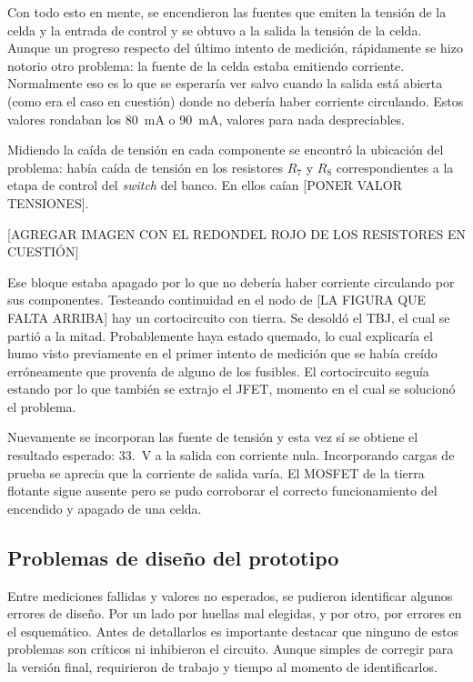 Con todo esto en mente, se encendieron las fuentes que emiten la tensión de la celda y la entrada de control y se obtuvo a la salida la tensión de la celda. Aunque un progreso respecto del último intento de medición, rápidamente se hizo notorio otro problema: la fuente de la celda estaba emitiendo corriente. Normalmente eso es lo que se esperaría ver salvo cuando la salida está abierta (como era el caso en cuestión) donde no debería haber corriente circulando. Estos valores rondaban los \SI{80}{\milli\ampere} o \SI{90}{\milli\ampere}, valores para nada despreciables. 

Midiendo la caída de tensión en cada componente se encontró la ubicación del problema: había caída de tensión en los resistores $R_7$ y $R_8$ correspondientes a la etapa de control del \textit{switch} del banco. En ellos caían [PONER VALOR TENSIONES].

[AGREGAR IMAGEN CON EL REDONDEL ROJO DE LOS RESISTORES EN CUESTIÓN]

Ese bloque estaba apagado por lo que no debería haber corriente circulando por sus componentes. Testeando continuidad en el nodo de [LA FIGURA QUE FALTA ARRIBA] hay un cortocircuito con tierra. Se desoldó el TBJ, el cual se partió a la mitad. Probablemente haya estado quemado, lo cual explicaría el humo visto previamente en el primer intento de medición que se había creído erróneamente que provenía de alguno de los fusibles. El cortocircuito seguía estando por lo que también se extrajo el JFET, momento en el cual se solucionó el problema.

Nuevamente se incorporan las fuente de tensión y esta vez sí se obtiene el resultado esperado: \SI{33.}{\volt} a la salida con corriente nula. Incorporando cargas de prueba se aprecia que la corriente de salida varía. El MOSFET de la tierra flotante sigue ausente pero se pudo corroborar el correcto funcionamiento del encendido y apagado de una celda.

\subsection{Problemas de diseño del prototipo}

Entre mediciones fallidas y valores no esperados, se pudieron identificar algunos errores de diseño. Por un lado por huellas mal elegidas, y por otro, por errores en el esquemático. Antes de detallarlos es importante destacar que ninguno de estos problemas son críticos ni inhibieron el circuito. Aunque simples de corregir para la versión final, requirieron de trabajo y tiempo al momento de identificarlos.

